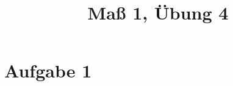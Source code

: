 \documentclass[]{article}
\author{}
\title{Maß 1, Übung 4}
\begin{document}
    \begin{titlepage}
        \maketitle
    \end{titlepage}
    
    \section{Aufgabe 1}
    

    
    
\end{document}
